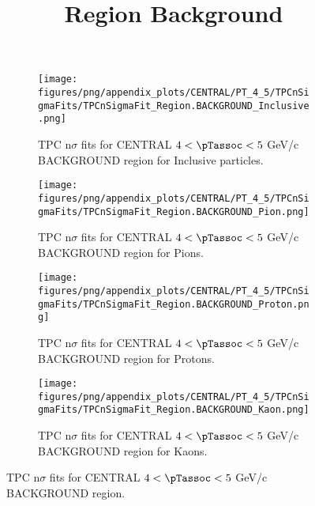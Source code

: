             \begin{figure}[H]
                \title{Region Background}
                \begin{subfigure}[b]{0.5\textwidth}
                    \centering
                    \texttt{[image: figures/png/appendix\_plots/CENTRAL/PT\_4\_5/TPCnSigmaFits/TPCnSigmaFit\_Region.BACKGROUND\_Inclusive.png]}
                    \caption{TPC n$\sigma$ fits for CENTRAL $4 < \pTassoc < 5$ GeV/c BACKGROUND region for Inclusive particles.}
                    \label{fig:appendix_CENTRAL_$4 < \pTassoc < 5$ GeV/c_BACKGROUND_Inclusive}
                \end{subfigure}
                \begin{subfigure}[b]{0.5\textwidth}
                    \centering
                    \texttt{[image: figures/png/appendix\_plots/CENTRAL/PT\_4\_5/TPCnSigmaFits/TPCnSigmaFit\_Region.BACKGROUND\_Pion.png]}
                    \caption{TPC n$\sigma$ fits for CENTRAL $4 < \pTassoc < 5$ GeV/c BACKGROUND region for Pions.}
                    \label{fig:appendix_CENTRAL_$4 < \pTassoc < 5$ GeV/c_BACKGROUND_Pion}
                \end{subfigure}
                \begin{subfigure}[b]{0.5\textwidth}
                    \centering
                    \texttt{[image: figures/png/appendix\_plots/CENTRAL/PT\_4\_5/TPCnSigmaFits/TPCnSigmaFit\_Region.BACKGROUND\_Proton.png]}
                    \caption{TPC n$\sigma$ fits for CENTRAL $4 < \pTassoc < 5$ GeV/c BACKGROUND region for Protons.}
                    \label{fig:appendix_CENTRAL_$4 < \pTassoc < 5$ GeV/c_BACKGROUND_Proton}
                \end{subfigure}
                \begin{subfigure}[b]{0.5\textwidth}
                    \centering
                    \texttt{[image: figures/png/appendix\_plots/CENTRAL/PT\_4\_5/TPCnSigmaFits/TPCnSigmaFit\_Region.BACKGROUND\_Kaon.png]}
                    \caption{TPC n$\sigma$ fits for CENTRAL $4 < \pTassoc < 5$ GeV/c BACKGROUND region for Kaons.}
                    \label{fig:appendix_CENTRAL_$4 < \pTassoc < 5$ GeV/c_BACKGROUND_Kaon}
                \end{subfigure}
                \caption{TPC n$\sigma$ fits for CENTRAL $4 < \pTassoc < 5$ GeV/c BACKGROUND region.}
                \label{fig:appendix_CENTRAL_$4 < \pTassoc < 5$ GeV/c_BACKGROUND}
            \end{figure}
            \clearpage
            
